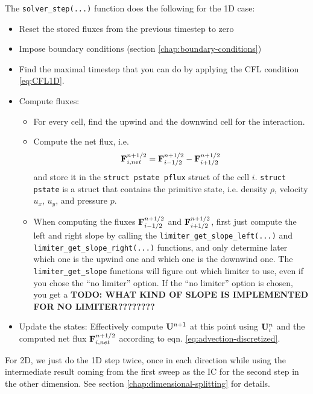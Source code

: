 The \verb|solver_step(...)| function does the following for the 1D case:
\begin{itemize}
	\item 	Reset the stored fluxes from the previous timestep to zero
	\item 	Impose boundary conditions (section \ref{chap:boundary-conditions})
	\item 	Find the maximal timestep that you can do by applying the CFL condition \ref{eq:CFL1D}.
	\item 	Compute fluxes:
	\begin{itemize}
		\item 	For every cell, find the upwind and the downwind cell for the interaction.
		\item 	Compute the net flux, i.e.
				\begin{equation}
				\mathbf{F}_{i, net}^{n+1/2} = \mathbf{F}_{i-1/2}^{n+1/2} - \mathbf{F}_{i+1/2}^{n+1/2}
				\end{equation}
				and store it in the \texttt{struct pstate pflux} struct of the cell $i$.
				\texttt{struct pstate} is a struct that contains the primitive state, i.e. density $\rho$, velocity $u_x$, $u_y$, and pressure $p$.
		\item 	When computing the fluxes $\mathbf{F}_{i-1/2}^{n+1/2}$ and $\mathbf{F}_{i+1/2}^{n+1/2}$, first just compute the left and right slope by calling the \verb|limiter_get_slope_left(...)| and \verb|limiter_get_slope_right(...)| functions, and only determine later which one is the upwind one and which one is the downwind one.
		The \verb|limiter_get_slope| functions will figure out which limiter to use, even if you chose the ``no limiter'' option.
		If the ``no limiter'' option is chosen, you get a \textbf{TODO: WHAT KIND OF SLOPE IS IMPLEMENTED FOR NO LIMITER????????}
	\end{itemize}
	\item 	Update the states: Effectively compute $\mathbf{U}^{n+1}$ at this point using $\mathbf{U}_i^n$ and the computed net flux $\mathbf{F}_{i, net}^{n+1/2}$ according to eqn. \ref{eq:advection-discretized}.
\end{itemize}



For 2D, we just do the 1D step twice, once in each direction while using the intermediate result coming from the first sweep as the IC for the second step in the other dimension.
See section \ref{chap:dimensional-splitting} for details.











